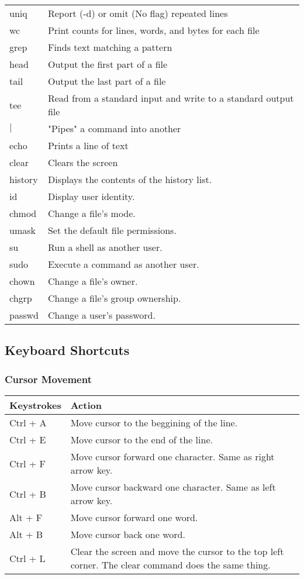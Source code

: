 \documentclass[12pt]{article}
\begin{document}
\begin{tabular}{| l | l |}
	uniq & Report (-d) or omit (No flag) repeated lines\\
	wc & Print counts for lines, words, and bytes for each file\\
	grep & Finds text matching a pattern\\
	head & Output the first part of a file\\
	tail & Output the last part of a file\\
	tee & Read from a standard input and write to a standard output file\\
	$|$ & "Pipes" a command into another\\
	echo & Prints a line of text\\
	clear & Clears the screen\\
	history & Displays the contents of the history list.\\
	id & Display user identity.\\
	chmod & Change a file's mode.\\
	umask & Set the default file permissions.\\
	su & Run a shell as another user.\\
	sudo & Execute a command as another user.\\
	chown & Change a file's owner.\\
	chgrp & Change a file's group ownership.\\
	passwd & Change a user's password.\\

	\hline
\end{tabular}

\newpage
\subsection{Keyboard Shortcuts}%
\subsubsection{Cursor Movement}%
\begin{tabular}{|l|p{5in}|}
	\hline
	Keystrokes & Action\\ \hline
	Ctrl + A & Move cursor to the beggining of the line.\\
	Ctrl + E & Move cursor to the end of the line.\\
	Ctrl + F & Move cursor forward one character. Same as right arrow key.\\
	Ctrl + B & Move cursor backward one character. Same as left arrow key.\\
	Alt + F  & Move cursor forward one word.\\
	Alt + B  & Move cursor back one word.\\
	Ctrl + L & Clear the screen and move the cursor to the top left corner. The clear command does the same thing.\\
	
	\hline
\end{tabular}
\end{document}
